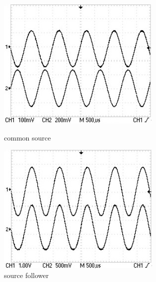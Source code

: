 \documentclass[10pt,a4paper]{article}
\begin{document}
\begin{figure}[h!]
	\centering
	\begin{minipage}[h!]{0.45\textwidth}
		\centering
		\includegraphics[width=\textwidth]{../oscilloscopio/inversione_fase.jpg}
		\caption{common source}
			\label{fig:controfase}
	\end{minipage}
	\begin{minipage}[h!]{0.45\textwidth}
		\centering
		\includegraphics[width=\textwidth]{../oscilloscopio/fase.jpg}
		\caption{source follower}
			\label{infase}
	\end{minipage}

\end{figure}
\end{document}
